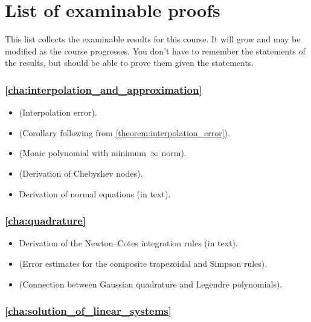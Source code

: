 \chapter*{List of examinable proofs}%
This list collects the examinable results for this course.
It will grow and may be modified as the course progresses.
You don't have to remember the statements of the results,
but should be able to prove them given the statements.

\subsection*{\cref{cha:interpolation_and_approximation}}%

\begin{itemize}
    \item {} (Interpolation error).
    \item {} (Corollary following from \cref{theorem:interpolation_error}).
    \item {} (Monic polynomial with minimum~$\infty$ norm).
    \item {} (Derivation of Chebyshev nodes).
    \item Derivation of normal equations (in text).
\end{itemize}

\subsection*{\cref{cha:quadrature}}%

\begin{itemize}
    \item Derivation of the Newton--Cotes integration rules (in text).
    \item {}
        (Error estimates for the composite trapezoidal and Simpson rules).
    \item
        (Connection between Gaussian quadrature and Legendre polynomials).
\end{itemize}

\subsection*{\cref{cha:solution_of_linear_systems}}%

